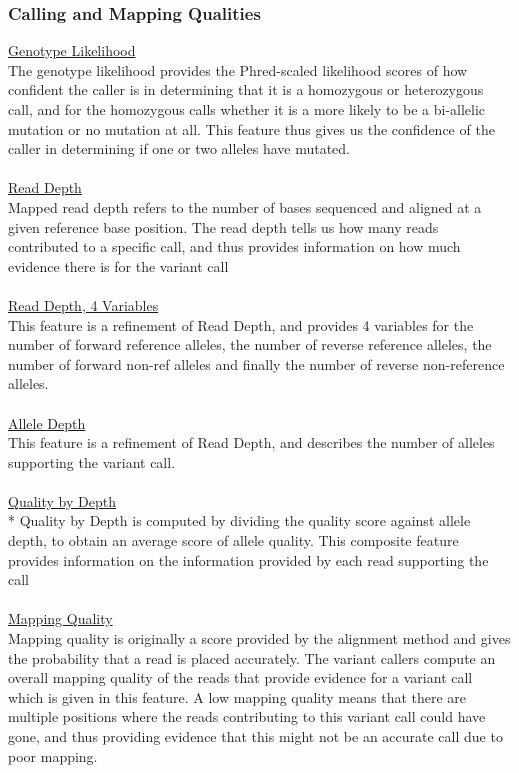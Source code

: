 \documentclass{article}
\begin{document}
\subsubsection{Calling and Mapping Qualities}
\underline{Genotype Likelihood}\\
The genotype likelihood provides the Phred-scaled likelihood scores of how confident the caller is in determining that it is a homozygous or heterozygous call, and for the homozygous calls whether it is a more likely to be a bi-allelic mutation or no mutation at all. This feature thus gives us the confidence of the caller in determining if one or two alleles have mutated. \\\\ 
\underline{Read Depth}\\
Mapped read depth refers to the number of bases sequenced and aligned at a given reference base position. The read depth tells us how many reads contributed to a specific call, and thus provides information on how much evidence there is for the variant call\\\\
\underline{Read Depth, 4 Variables}\\
This feature is a refinement of Read Depth, and provides 4 variables for the number of forward reference alleles, the number of reverse reference alleles, the number of  forward non-ref alleles and finally the number of reverse non-reference alleles.\\\\
\underline{Allele Depth}\\
This feature is a refinement of Read Depth, and describes the number of alleles supporting the variant call.\\\\
\underline{Quality by Depth}\\*
Quality by Depth is computed by dividing the quality score against allele depth, to obtain an average score of allele quality. This composite feature provides information on the information provided by each read supporting the call\\\\
\underline{Mapping Quality}\\
Mapping quality is originally a score provided by the alignment method and gives the probability that a read is placed accurately. The variant callers compute an overall mapping quality of the reads that provide evidence for a variant call which is given in this feature. A low mapping quality means that there are multiple positions where the reads contributing to this variant call could have gone, and thus providing evidence that this might not be an accurate call due to poor mapping.\\\\
\end{document}
